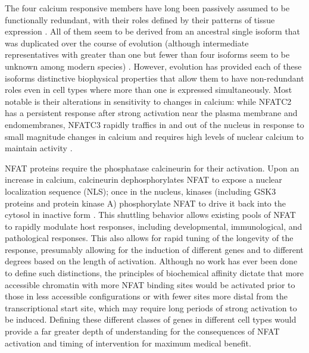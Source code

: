 The four calcium responsive members have long been passively assumed to be functionally redundant, with their roles defined by their patterns of tissue expression \citep{Klein2006, Mancini2009, Macian2005, Chow1999}. All of them seem to be derived from an ancestral single isoform that was duplicated over the course of evolution (although intermediate representatives with greater than one but fewer than four isoforms seem to be unknown among modern species) \citep{Muller2010}. However, evolution has provided each of these isoforms distinctive biophysical properties that allow them to have non\hyp{}redundant roles even in cell types where more than one is expressed simultaneously. Most notable is their alterations in sensitivity to changes in calcium: while NFATC2 has a persistent response after strong activation near the plasma membrane and endomembranes, NFATC3 rapidly traffics in and out of the nucleus in response to small magnitude changes in calcium and requires high levels of nuclear calcium to maintain activity \citep{Yissachar2013, Kar2015, Kar2016}. 

NFAT proteins require the phosphatase calcineurin for their activation. Upon an increase in calcium, calcineurin dephosphorylates NFAT to expose a nuclear localization sequence (NLS); once in the nucleus, kinases (including GSK3 proteins and protein kinase A) phosphorylate NFAT to drive it back into the cytosol in inactive form \citep{Crabtree2002}. This shuttling behavior allows existing pools of NFAT to rapidly modulate host responses, including developmental, immunological, and pathological responses. This also allows for rapid tuning of the longevity of the response, presumably allowing for the induction of different genes and to different degrees based on the length of activation. Although no work has ever been done to define such distinctions, the principles of biochemical affinity dictate that more accessible chromatin with more NFAT binding sites would be activated prior to those in less accessible configurations or with fewer sites more distal from the transcriptional start site, which may require long periods of strong activation to be induced. Defining these different classes of genes in different cell types would provide a far greater depth of understanding for the consequences of NFAT activation and timing of intervention for maximum medical benefit.

